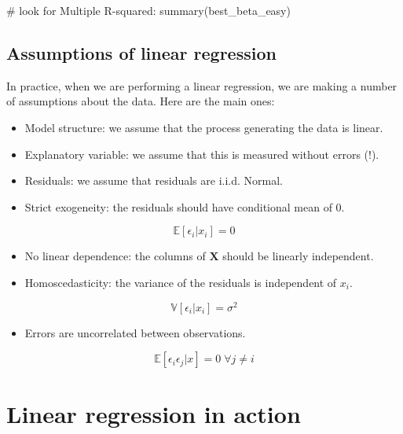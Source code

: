 \documentclass[
  letterpaper,
  DIV=11,
  numbers=noendperiod]{scrreprt}
\newenvironment{Shaded}{\begin{snugshade}}{\end{snugshade}}
\newcommand{\NormalTok}[1]{\textcolor[rgb]{0.00,0.23,0.31}{#1}}
\providecommand{\tightlist}{%
  \setlength{\itemsep}{0pt}\setlength{\parskip}{0pt}}\usepackage{longtable,booktabs,array}
\begin{document}
\begin{Shaded}
\begin{Highlighting}[]
\NormalTok{\# look for Multiple R{-}squared:}
\NormalTok{summary(best\_beta\_easy)}
\end{Highlighting}
\end{Shaded}

\subsection{Assumptions of linear
regression}\label{assumptions-of-linear-regression}

In practice, when we are performing a linear regression, we are making a
number of assumptions about the data. Here are the main ones:

\begin{itemize}
\tightlist
\item
  Model structure: we assume that the process generating the data is
  linear.
\item
  Explanatory variable: we assume that this is measured without errors
  (!).
\item
  Residuals: we assume that residuals are i.i.d. Normal.
\item
  Strict exogeneity: the residuals should have conditional mean of 0.
\end{itemize}

\[
\mathbb E[\epsilon_i | x_i] = 0
\]

\begin{itemize}
\tightlist
\item
  No linear dependence: the columns of \(\mathbf{X}\) should be linearly
  independent.
\item
  Homoscedasticity: the variance of the residuals is independent of
  \(x_i\).
\end{itemize}

\[
\mathbb V[\epsilon_i | x_i] =  \sigma^2
\]

\begin{itemize}
\tightlist
\item
  Errors are uncorrelated between observations.
\end{itemize}

\[
\mathbb E[\epsilon_i \epsilon_j | x] = 0 \; \forall j \neq i
\]

\section{Linear regression in action}\label{linear-regression-in-action}
\end{document}
